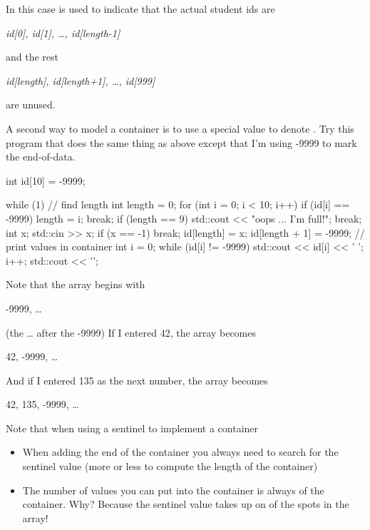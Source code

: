 In this case \texttt{} is used to indicate that the actual student ids are

\begin{center}
\textit{id[0], id[1], \ldots, id[length-1]}
\end{center}

and the rest

\begin{center}
\textit{id[length], id[length+1], \ldots, id[999]}
\end{center}

are unused.

A second way to model a container is to use a special  value to denote . Try this program that does the same thing as above except that I'm using -9999 to mark the end-of-data.

\begin{consolethree}[escapeinside=||]
int id[10] = {-9999};

while (1)
{
    // find length
    int length = 0;
    for (int i = 0; i < 10; i++)
    {
        if (id[i] == -9999)
        {
            length = i;
            break;
        }
    }
    if (length == 9)
    {
        std::cout << "oops ... I'm full!\n";
        break;
    }
    int x;
    std::cin >> x;
    if (x == -1) break;
    id[length] = x;
    id[length + 1] = -9999;
    // print values in container
    int i = 0;
    while (id[i] != -9999)
    {
        std::cout << id[i] << ' ';
        i++;
    }
    std::cout << '\n';
}
\end{consolethree}

Note that the array begins with

\begin{center}
-9999, \ldots{}
\end{center}

(the \ldots{} after the -9999) If I entered 42, the array becomes

\begin{center}
42, -9999, \ldots{}
\end{center}

And if I entered 135 as the next number, the array becomes

\begin{center}
42, 135, -9999, \ldots{}
\end{center}

Note that when using a sentinel to implement a container

\begin{itemize}
\item
When adding the end of the container you always need to search for the sentinel value (more or less to compute the length of the container)
\item
The number of values you can put into the container is always  of the container. Why? Because the sentinel value takes up on of the spots in the array!
\end{itemize}


